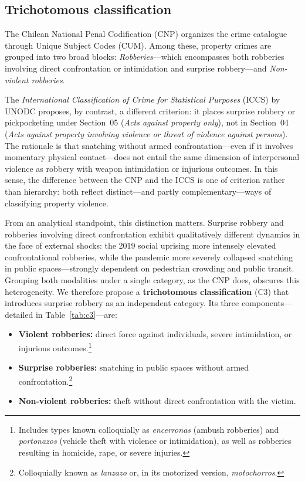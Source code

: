 \documentclass[pdflatex,sn-basic]{sn-jnl}
\begin{document}
\subsection{Trichotomous classification}
\label{sub:clasificacion}

The Chilean National Penal Codification (CNP) organizes the crime catalogue
through Unique Subject Codes (CUM). Among these, property crimes are grouped
into two broad blocks: \textit{Robberies}---which encompasses both robberies
involving direct confrontation or intimidation and surprise robbery---and
\textit{Non-violent robberies}.

The \textit{International Classification of Crime for Statistical Purposes}
(ICCS) by UNODC proposes, by contrast, a different criterion: it places
surprise robbery or pickpocketing under Section~05 (\textit{Acts against
property only}), not in Section~04 (\textit{Acts against property involving
violence or threat of violence against persons}). The rationale is that
snatching without armed confrontation---even if it involves momentary physical
contact---does not entail the same dimension of interpersonal violence as
robbery with weapon intimidation or injurious outcomes. In this sense, the
difference between the CNP and the ICCS is one of criterion rather than
hierarchy: both reflect distinct---and partly complementary---ways of
classifying property violence.

From an analytical standpoint, this distinction matters. Surprise robbery
and robberies involving direct confrontation exhibit qualitatively different
dynamics in the face of external shocks: the 2019 social uprising more
intensely elevated confrontational robberies, while the pandemic more
severely collapsed snatching in public spaces---strongly dependent on
pedestrian crowding and public transit. Grouping both modalities under a
single category, as the CNP does, obscures this heterogeneity. We therefore
propose a \textbf{trichotomous classification} (C3) that introduces surprise
robbery as an independent category. Its three components---detailed in
Table~\ref{tab:c3}---are:

\begin{itemize}
  \item \textbf{Violent robberies:} direct force against individuals, severe
    intimidation, or injurious outcomes.\footnote{Includes types known
    colloquially as \textit{encerronas} (ambush robberies) and
    \textit{portonazos} (vehicle theft with violence or intimidation),
    as well as robberies resulting in homicide, rape, or severe injuries.}
  \item \textbf{Surprise robberies:} snatching in public spaces without
    armed confrontation.\footnote{Colloquially known as \textit{lanzazo}
    or, in its motorized version, \textit{motochorros}.}
  \item \textbf{Non-violent robberies:} theft without direct confrontation
    with the victim.
\end{itemize}
\end{document}
